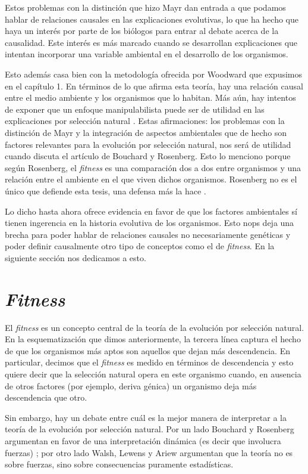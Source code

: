 Estos problemas con la distinción que hizo Mayr dan entrada a que podamos hablar de relaciones causales en las explicaciones evolutivas, lo que ha hecho que haya un interés por parte de los biólogos para entrar al debate acerca de la causalidad. Este interés es más marcado cuando se desarrollan explicaciones que intentan incorporar una variable ambiental en el desarrollo de los organismos.

Esto además casa bien con la metodología ofrecida por Woodward que expusimos en el capítulo 1. En términos de lo que afirma esta teoría, hay una relación causal entre el medio ambiente y los organismos que lo habitan. Más aún, hay intentos de exponer que un enfoque manipulabilista puede ser de utilidad en las explicaciones por selección natural \cite{MacColl2011}. Estas afirmaciones: los problemas con la distinción de Mayr y la integración de aspectos ambientales que de hecho son factores relevantes para la evolución por selección natural, nos será de utilidad cuando discuta el artículo de Bouchard y Rosenberg. Esto lo menciono porque según Rosenberg, el \emph{fitness} es una comparación dos a dos entre organismos y una relación entre el ambiente en el que viven dichos organismos. Rosenberg no es el único que defiende esta tesis, una defensa más la hace \cite{Glymour2011}.

Lo dicho hasta ahora ofrece evidencia en favor de que los factores ambientales sí tienen ingerencia en la historia evolutiva de los organismos. Esto nops deja una brecha para poder hablar de relaciones causales no necesariamente genéticas y poder definir causalmente otro tipo de conceptos como el de \emph{fitness}. En la siguiente sección nos dedicamos a esto.

\section{\emph{Fitness}}

\noindent El \emph{fitness} es un concepto central de la teoría de la evolución por selección natural. En la esquematización que dimos anteriormente, la tercera línea captura el hecho de que los organismos más aptos son aquellos que dejan más descendencia. En particular, decimos que el \emph{fitness} es medido en términos de descendencia y esto quiere decir que la selección natural opera en este organismo cuando, en ausencia de otros factores (por ejemplo, deriva génica) un organismo deja más descendencia que otro.

Sin embargo, hay un debate entre cuál es la mejor manera de interpretar a la teoría de la evolución por selección natural. Por un lado Bouchard y Rosenberg argumentan en favor de una interpretación dinámica (es decir que involucra fuerzas) \citeyear{Bouchard2004}; por otro lado Walsh, Lewens y Ariew \citeyear{Walsh2002} argumentan que la teoría no es sobre fuerzas, sino sobre consecuencias puramente estadísticas.



